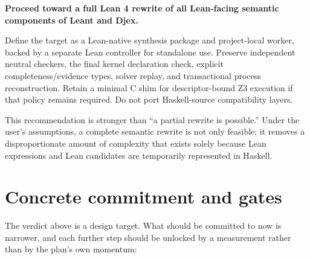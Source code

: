\documentclass[10pt,letterpaper,oneside]{report}
\begin{document}
\begin{verdictbox}
\textbf{Proceed toward a full Lean 4 rewrite of all Lean-facing semantic components of Leant and Djex.}

Define the target as a Lean-native synthesis package and project-local worker, backed by a separate Lean controller for standalone use. Preserve independent neutral checkers, the final kernel declaration check, explicit completeness/evidence types, solver replay, and transactional process reconstruction. Retain a minimal C shim for descriptor-bound Z3 execution if that policy remains required. Do not port Haskell-source compatibility layers.
\end{verdictbox}

This recommendation is stronger than ``a partial rewrite is possible.'' Under the user's assumptions, a complete semantic rewrite is not only feasible; it removes a disproportionate amount of complexity that exists solely because Lean expressions and Lean candidates are temporarily represented in Haskell.

\section{Concrete commitment and gates}\label{sec:gates}

The verdict above is a design target. What should be committed to now is narrower, and each further step should be unlocked by a measurement rather than by the plan's own momentum:
\end{document}
